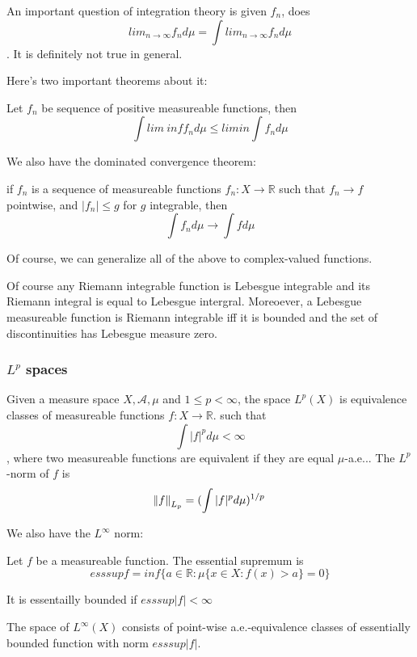 \documentclass[main.tex]{subfiles}
\begin{document}
An important question of integration theory is given $f_n$, does $$
lim_{n \rightarrow \infty} f_n d \mu = \int lim_{n \rightarrow \infty} f_n d \mu
$$.
It is definitely not true in general. 

Here's two important theorems about it:

\begin{theorem}
Let $f_n$ be sequence of positive measureable functions, then 
$$
\int lim\ inf f_n d\mu \leq lim in \int f_n d\mu
$$
\end{theorem}


We also have the dominated convergence theorem:
\begin{theorem}
if $f_n$ is a sequence of measureable functions $f_n: X \rightarrow \mathbb{R}$ such that $f_n \rightarrow f$ pointwise, and $|f_n| \leq g$ for $g$ integrable, then
$$
\int f_n d\mu \rightarrow \int f d\mu 
$$
\end{theorem}

Of course, we can generalize all of the above to complex-valued functions.

\begin{theorem}
Of course any Riemann integrable function is Lebesgue integrable and its Riemann integral is equal to Lebesgue intergral. Moreoever, a Lebesgue measureable function is Riemann integrable iff it is bounded and the set of discontinuities has Lebesgue measure zero.
\end{theorem}

\subsubsection{$L^p$ spaces}

\begin{definition}
Given a measure space $X, \mathcal{A}, \mu$ and $1 \leq p < \infty$, the space $L^p(X)$ is equivalence classes of measureable functions $f: X \rightarrow \mathbb{R}$. such that
$$
\int |f|^p d\mu < \infty
$$, 
where two measureable functions are equivalent if they are equal $\mu$-a.e... The $L^p$-norm of $f$ is 
$$
\norm{f}_{L_p} = (\int |f|^p d\mu )^{1/p}
$$

\end{definition}
We also have the $L^\infty$ norm:
\begin{definition}
Let $f$ be a measureable function. The essential supremum is 
$$
ess sup f = inf \{a \in \mathbb{R}: \mu \{x \in X : f(x) > a \} = 0 \}
$$

It is essentailly bounded if $ess sup|f| < \infty$

The space of $L^\infty(X)$ consists of point-wise a.e.-equivalence classes of essentially bounded function with norm $ess sup|f|$.
\end{definition}
\end{document}
